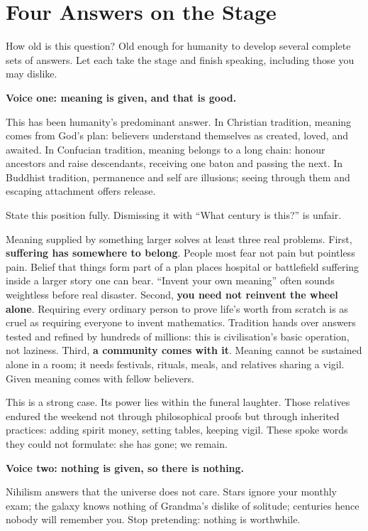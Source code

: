\section{Four Answers on the Stage}
How old is this question? Old enough for humanity to develop several complete sets of answers. Let each take the stage and finish speaking, including those you may dislike.

\textbf{Voice one: meaning is given, and that is good.}

This has been humanity's predominant answer. In Christian tradition, meaning comes from God's plan: believers understand themselves as created, loved, and awaited. In Confucian tradition, meaning belongs to a long chain: honour ancestors and raise descendants, receiving one baton and passing the next. In Buddhist tradition, permanence and self are illusions; seeing through them and escaping attachment offers release.

State this position fully. Dismissing it with ``What century is this?'' is unfair.

Meaning supplied by something larger solves at least three real problems. First, \textbf{suffering has somewhere to belong}. People most fear not pain but pointless pain. Belief that things form part of a plan places hospital or battlefield suffering inside a larger story one can bear. ``Invent your own meaning'' often sounds weightless before real disaster. Second, \textbf{you need not reinvent the wheel alone}. Requiring every ordinary person to prove life's worth from scratch is as cruel as requiring everyone to invent mathematics. Tradition hands over answers tested and refined by hundreds of millions: this is civilisation's basic operation, not laziness. Third, \textbf{a community comes with it}. Meaning cannot be sustained alone in a room; it needs festivals, rituals, meals, and relatives sharing a vigil. Given meaning comes with fellow believers.

This is a strong case. Its power lies within the funeral laughter. Those relatives endured the weekend not through philosophical proofs but through inherited practices: adding spirit money, setting tables, keeping vigil. These spoke words they could not formulate: she has gone; we remain.

\textbf{Voice two: nothing is given, so there is nothing.}

Nihilism answers that the universe does not care. Stars ignore your monthly exam; the galaxy knows nothing of Grandma's dislike of solitude; centuries hence nobody will remember you. Stop pretending: nothing is worthwhile.


